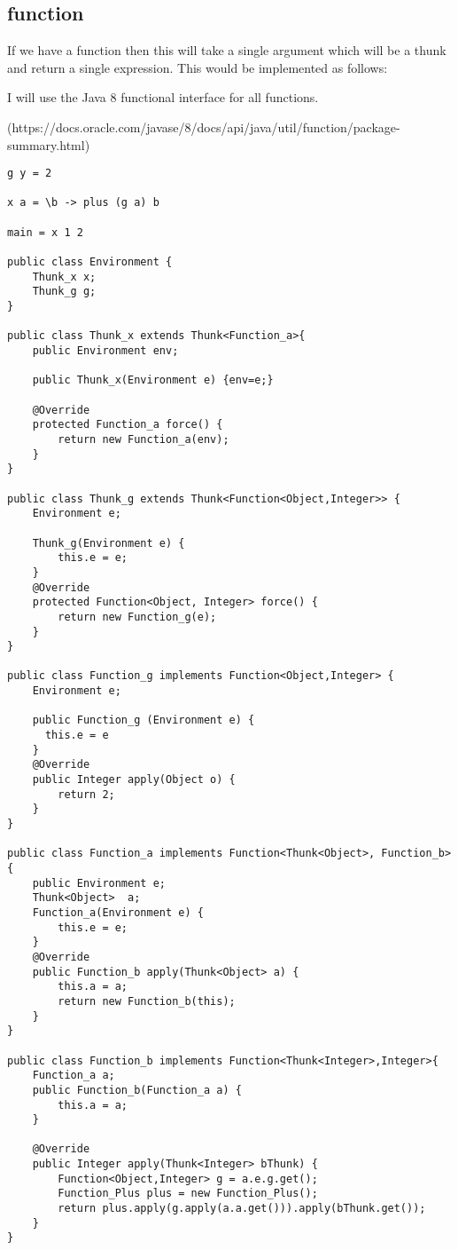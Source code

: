 \documentclass[12pt,a4paper,twoside]{article}
\begin{document}
\subsection{function}

If we have a function then this will take a single argument which will be a thunk and return a single expression. 
This would be implemented as follows:

I will use the Java 8 functional interface for all functions.

(https://docs.oracle.com/javase/8/docs/api/java/util/function/package-summary.html)

\begin{verbatim}
g y = 2
  
x a = \b -> plus (g a) b

main = x 1 2

public class Environment {
    Thunk_x x;
    Thunk_g g;
}

public class Thunk_x extends Thunk<Function_a>{
    public Environment env;

    public Thunk_x(Environment e) {env=e;}

    @Override
    protected Function_a force() {
        return new Function_a(env);
    }
}

public class Thunk_g extends Thunk<Function<Object,Integer>> {
    Environment e;

    Thunk_g(Environment e) {
        this.e = e;
    }
    @Override
    protected Function<Object, Integer> force() {
        return new Function_g(e);
    }
}

public class Function_g implements Function<Object,Integer> {
    Environment e;

    public Function_g (Environment e) {
      this.e = e
    }
    @Override
    public Integer apply(Object o) {
        return 2;
    }
}

public class Function_a implements Function<Thunk<Object>, Function_b> {
    public Environment e;
    Thunk<Object>  a;
    Function_a(Environment e) {
        this.e = e;
    }
    @Override
    public Function_b apply(Thunk<Object> a) {
        this.a = a;
        return new Function_b(this);
    }
}

public class Function_b implements Function<Thunk<Integer>,Integer>{
    Function_a a;
    public Function_b(Function_a a) {
        this.a = a;
    }

    @Override
    public Integer apply(Thunk<Integer> bThunk) {
        Function<Object,Integer> g = a.e.g.get();
        Function_Plus plus = new Function_Plus();
        return plus.apply(g.apply(a.a.get())).apply(bThunk.get());
    }
}


\end{verbatim}
\end{document}
